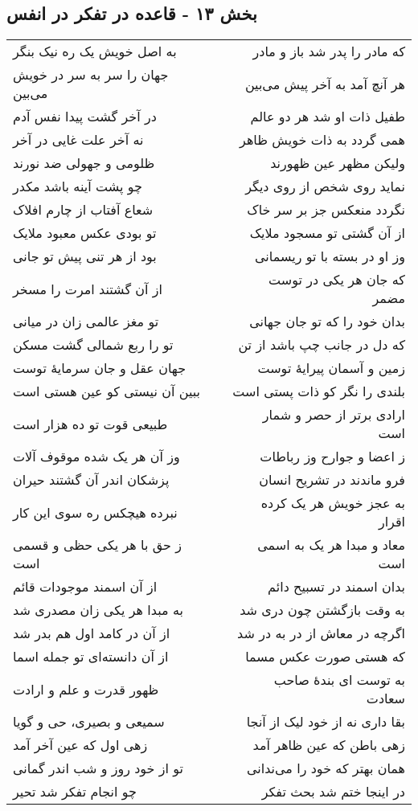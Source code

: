 \begin{center}
\section*{بخش ۱۳ - قاعده در تفکر در انفس}
\label{sec:sh013}
\begin{longtable}{l p{0.5cm} r}
به اصل خویش یک ره نیک بنگر
&&
که مادر را پدر شد باز و مادر
\\
جهان را سر به سر در خویش می‌بین
&&
هر آنچ آمد به آخر پیش می‌بین
\\
در آخر گشت پیدا نفس آدم
&&
طفیل ذات او شد هر دو عالم
\\
نه آخر علت غایی در آخر
&&
همی گردد به ذات خویش ظاهر
\\
ظلومی و جهولی ضد نورند
&&
ولیکن مظهر عین ظهورند
\\
چو پشت آینه باشد مکدر
&&
نماید روی شخص از روی دیگر
\\
شعاع آفتاب از چارم افلاک
&&
نگردد منعکس جز بر سر خاک
\\
تو بودی عکس معبود ملایک
&&
از آن گشتی تو مسجود ملایک
\\
بود از هر تنی پیش تو جانی
&&
وز او در بسته با تو ریسمانی
\\
از آن گشتند امرت را مسخر
&&
که جان هر یکی در توست مضمر
\\
تو مغز عالمی زان در میانی
&&
بدان خود را که تو جان جهانی
\\
تو را ربع شمالی گشت مسکن
&&
که دل در جانب چپ باشد از تن
\\
جهان عقل و جان سرمایهٔ توست
&&
زمین و آسمان پیرایهٔ توست
\\
ببین آن نیستی کو عین هستی است
&&
بلندی را نگر کو ذات پستی است
\\
طبیعی قوت تو ده هزار است
&&
ارادی برتر از حصر و شمار است
\\
وز آن هر یک شده موقوف آلات
&&
ز اعضا و جوارح وز رباطات
\\
پزشکان اندر آن گشتند حیران
&&
فرو ماندند در تشریح انسان
\\
نبرده هیچکس ره سوی این کار
&&
به عجز خویش هر یک کرده اقرار
\\
ز حق با هر یکی حظی و قسمی است
&&
معاد و مبدا هر یک به اسمی است
\\
از آن اسمند موجودات قائم
&&
بدان اسمند در تسبیح دائم
\\
به مبدا هر یکی زان مصدری شد
&&
به وقت بازگشتن چون دری شد
\\
از آن در کامد اول هم بدر شد
&&
اگرچه در معاش از در به در شد
\\
از آن دانسته‌ای تو جمله اسما
&&
که هستی صورت عکس مسما
\\
ظهور قدرت و علم و ارادت
&&
به توست ای بندهٔ صاحب سعادت
\\
سمیعی و بصیری، حی و گویا
&&
بقا داری نه از خود لیک از آنجا
\\
زهی اول که عین آخر آمد
&&
زهی باطن که عین ظاهر آمد
\\
تو از خود روز و شب اندر گمانی
&&
همان بهتر که خود را می‌ندانی
\\
چو انجام تفکر شد تحیر
&&
در اینجا ختم شد بحث تفکر
\\
\end{longtable}
\end{center}
